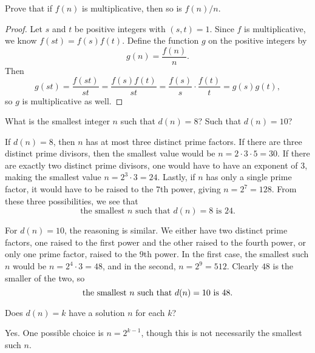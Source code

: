  Prove that if $f(n)$ is multiplicative, then so is $f(n)/n$.
\begin{proof}
  Let $s$ and $t$ be positive integers with $(s,t) = 1$. Since $f$ is
  multiplicative, we know $f(st) = f(s)f(t)$. Define the function $g$
  on the positive integers by
  \begin{equation*}
    g(n) = \frac{f(n)}n.
  \end{equation*}
  Then
  \begin{equation*}
    g(st) = \frac{f(st)}{st} = \frac{f(s)f(t)}{st}
    = \frac{f(s)}s\cdot\frac{f(t)}t = g(s)g(t),
  \end{equation*}
  so $g$ is multiplicative as well.
\end{proof}

 What is the smallest integer $n$ such that $d(n) = 8$? Such
that $d(n) = 10$?
\begin{solution}
  If $d(n) = 8$, then $n$ has at most three distinct prime factors. If
  there are three distinct prime divisors, then the smallest value
  would be $n = 2\cdot3\cdot5 = 30$. If there are exactly two distinct
  prime divisors, one would have to have an exponent of $3$, making
  the smallest value $n = 2^3\cdot3 = 24$. Lastly, if $n$ has only a
  single prime factor, it would have to be raised to the $7$th power,
  giving $n = 2^7 = 128$. From these three possibilities, we see that
  \begin{equation*}
    \text{the smallest $n$ such that $d(n) = 8$ is $24$.}
  \end{equation*}

  For $d(n) = 10$, the reasoning is similar. We either have two
  distinct prime factors, one raised to the first power and the other
  raised to the fourth power, or only one prime factor, raised to the
  $9$th power. In the first case, the smallest such $n$ would be
  $n = 2^4\cdot3 = 48$, and in the second, $n = 2^9 = 512$. Clearly
  $48$ is the smaller of the two, so
  \begin{equation*}
    \text{the smallest $n$ such that $d(n) = 10$ is $48$.} \qedhere
  \end{equation*}
\end{solution}

 Does $d(n) = k$ have a solution $n$ for each $k$?
\begin{solution}
  Yes. One possible choice is $n = 2^{k-1}$, though this is not
  necessarily the smallest such $n$.
\end{solution}

